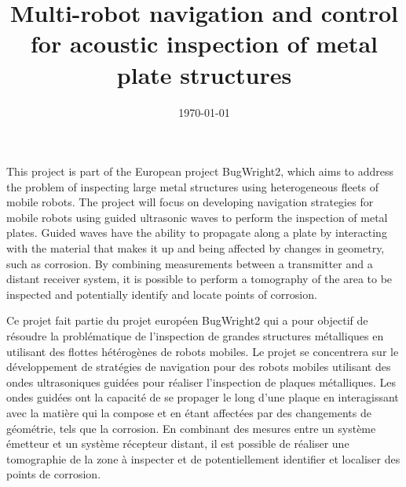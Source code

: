 \documentclass[init,francais,RandD]{rapportPFE}
\title{Multi-robot navigation and control for acoustic inspection of metal plate structures}
\date{\today}
\begin{document}
	\maketitle
	\begin{ResumeMotsCles}
		\begin{resumeEn}
			This project is part of the European project BugWright2, which aims to address the problem of inspecting large metal structures using heterogeneous fleets of mobile robots. The project will focus on developing navigation strategies for mobile robots using guided ultrasonic waves to perform the inspection of metal plates. Guided waves have the ability to propagate along a plate by interacting with the material that makes it up and being affected by changes in geometry, such as corrosion. By combining measurements between a transmitter and a distant receiver system, it is possible to perform a tomography of the area to be inspected and potentially identify and locate points of corrosion.
		\end{resumeEn}
		\begin{resumeFr}
			Ce projet fait partie du projet européen BugWright2 qui a pour objectif de résoudre la problématique de l'inspection de grandes structures métalliques en utilisant des flottes hétérogènes de robots mobiles. Le projet se concentrera sur le développement de stratégies de navigation pour des robots mobiles utilisant des ondes ultrasoniques guidées pour réaliser l'inspection de plaques métalliques. Les ondes guidées ont la capacité de se propager le long d'une plaque en interagissant avec la matière qui la compose et en étant affectées par des changements de géométrie, tels que la corrosion. En combinant des mesures entre un système émetteur et un système récepteur distant, il est possible de réaliser une tomographie de la zone à inspecter et de potentiellement identifier et localiser des points de corrosion.
		\end{resumeFr}
	\end{ResumeMotsCles}
	\setcounter{tocdepth}{3}
	\tableofcontents
	\cleardoublepage
\end{document}
